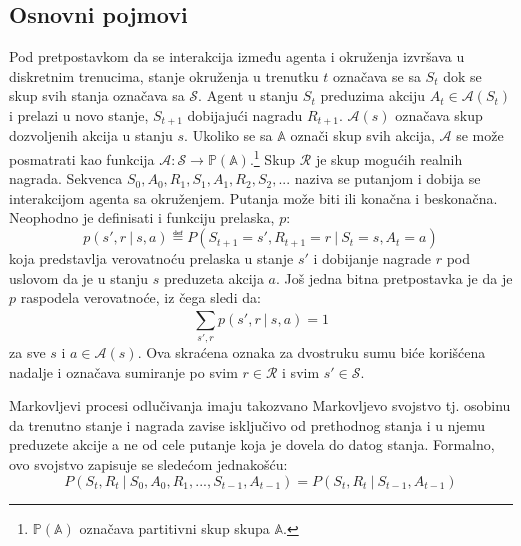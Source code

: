 \subsection{Osnovni pojmovi}
Pod pretpostavkom da se interakcija između agenta i okruženja izvršava u diskretnim trenucima, stanje okruženja u trenutku $t$ označava se sa $S_t$ dok se skup svih stanja označava sa $\mathcal{S}$.  Agent u stanju $S_t$ preduzima akciju $A_t \in \mathcal{A}(S_t)$ i prelazi u novo stanje, $S_{t+1}$ dobijajući nagradu $R_{t+1}$. $\mathcal{A}(s)$ označava skup dozvoljenih akcija u stanju $s$. Ukoliko se sa $\mathbb{A}$ označi skup svih akcija, $\mathcal{A}$ se može posmatrati kao funkcija  $\mathcal{A}: \mathcal{S} \rightarrow  \mathbb{P}(\mathbb{A})$.\footnote{$\mathbb{P}(\mathbb{A})$ označava partitivni skup skupa $\mathbb{A}$.} Skup $\mathcal{R}$ je skup mogućih realnih nagrada. Sekvenca $S_0, A_0, R_1, S_1, A_1, R_2, S_2, ...$ naziva se putanjom i dobija se interakcijom agenta sa okruženjem. Putanja može biti ili konačna i beskonačna.
Neophodno je definisati i funkciju prelaska, $p$:
\begin{equation}
	p(s', r~|~s, a) \eqdef P(S_{t+1} = s', R_{t+1} = r ~|~ S_t = s, A_t = a)
\end{equation}
koja predstavlja verovatnoću prelaska u stanje $s'$ i dobijanje nagrade $r$ pod uslovom da je u stanju $s$ preduzeta akcija $a$. Još jedna bitna pretpostavka je da je $p$ raspodela verovatnoće, iz čega sledi da:
\begin{equation}
	\sum_{s', r}^{} p(s', r~|~s, a) = 1
\end{equation}
za sve $s$ i $a \in \mathcal{A}(s)$. Ova skraćena oznaka za dvostruku sumu biće korišćena nadalje i označava sumiranje po svim $r \in \mathcal{R}$ i svim $s' \in \mathcal{S}$.
\par 
Markovljevi procesi odlučivanja imaju takozvano Markovljevo svojstvo tj. osobinu da trenutno stanje i nagrada zavise isključivo od prethodnog stanja i u njemu preduzete akcije a ne od cele putanje koja je dovela do datog stanja. Formalno, ovo svojstvo zapisuje se sledećom jednakošću:
\begin{equation}
	P(S_t, R_t ~|~ S_0, A_0, R_1, ..., S_{t-1}, A_{t-1}) = P(S_t, R_t ~|~ S_{t-1}, A_{t-1})
\end{equation}

